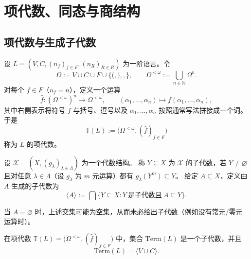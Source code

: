 \documentclass[lang=cn,a4paper,newtx,section]{elegantbook}
\begin{document}
\chapter{项代数、同态与商结构}

\section{项代数与生成子代数}

\begin{definition}
设 $L=(V,C,(n_f)_{f\in F},(n_R)_{R\in R})$ 为一阶语言。令
\[
  \Omega:=V\cup C\cup F\cup\{\mathtt{(},\mathtt{)},\mathtt{,}\},\qquad \Omega^{<\omega}:=\bigcup_{n\in\mathbb N}\Omega^{n}.
\]
对每个 $f\in F$（$n_f=n$），定义一个运算
\[
  \widehat f:(\Omega^{<\omega})^{n}\to\Omega^{<\omega},\qquad (\alpha_1,\dots,\alpha_n)\longmapsto f(\alpha_1,\dots,\alpha_n),
\]
其中右侧表示将符号 $f$ 与括号、逗号以及 $\alpha_1,\dots,\alpha_n$ 按照通常写法拼接成一个词。
于是
\[
  \mathbb T(L):=\bigl(\Omega^{<\omega},(\widehat f)_{f\in F}\bigr)
\]
称为 $L$ 的项代数。
\end{definition}

\begin{definition}[生成子代数]
设 $\mathcal X=(X,(g_\lambda)_{\lambda\in\Lambda})$ 为一个代数结构。
称 $Y\subseteq X$ 为 $\mathcal X$ 的子代数，若 $Y\neq\varnothing$ 且对任意 $\lambda\in\Lambda$（设 $g_\lambda$ 为 $m$ 元运算）都有 $g_\lambda(Y^{m})\subseteq Y$。
给定 $A\subseteq X$，定义由 $A$ 生成的子代数为
\[
  \langle A\rangle:=\bigcap\{Y\subseteq X: Y\ \text{是子代数且}\ A\subseteq Y\}.
\]
\end{definition}

\begin{remark}
当 $A=\varnothing$ 时，上述交集可能为空集，从而未必给出子代数（例如没有常元/零元运算时）。
\end{remark}

\begin{proposition}
在项代数 $\mathbb T(L)=\bigl(\Omega^{<\omega},(\widehat f)_{f\in F}\bigr)$ 中，集合 $\mathrm{Term}(L)$ 是一个子代数，并且
\[
  \mathrm{Term}(L)=\langle V\cup C\rangle.
\]
\end{proposition}
\end{document}
